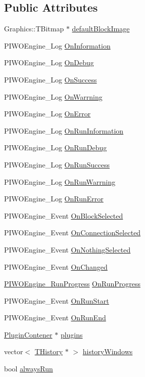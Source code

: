 \subsection*{Public Attributes}
\begin{CompactItemize}
\item 
Graphics::TBitmap $\ast$ \hyperlink{classPIWOEngine_23d5dbc92608ee42ba7975d2454ecbcf}{defaultBlockImage}
\item 
PIWOEngine\_\-Log \hyperlink{classPIWOEngine_e5b5e665729db134c485ff27305b7888}{OnInformation}
\item 
PIWOEngine\_\-Log \hyperlink{classPIWOEngine_52bbb80846422f21ab9b03d67ad67a60}{OnDebug}
\item 
PIWOEngine\_\-Log \hyperlink{classPIWOEngine_37a8c63dad516bc24be59cdca3a1eaa6}{OnSuccess}
\item 
PIWOEngine\_\-Log \hyperlink{classPIWOEngine_c7a83bdff3736e35b68584bcb3a4b699}{OnWarrning}
\item 
PIWOEngine\_\-Log \hyperlink{classPIWOEngine_55424b81f56591f23f3b58e0fdd399d2}{OnError}
\item 
PIWOEngine\_\-Log \hyperlink{classPIWOEngine_02e912fd9ead4eabd48b32f769bd77c1}{OnRunInformation}
\item 
PIWOEngine\_\-Log \hyperlink{classPIWOEngine_cc1ea09371765860dfc2912dc605f9be}{OnRunDebug}
\item 
PIWOEngine\_\-Log \hyperlink{classPIWOEngine_faa892e8c9a1a5973a300d2f02143897}{OnRunSuccess}
\item 
PIWOEngine\_\-Log \hyperlink{classPIWOEngine_ede20b6476b9e1d0db96878e2eee4481}{OnRunWarrning}
\item 
PIWOEngine\_\-Log \hyperlink{classPIWOEngine_303f960016f76986cba65e2c0aaea4e1}{OnRunError}
\item 
PIWOEngine\_\-Event \hyperlink{classPIWOEngine_ed5f12ba5e4872c5326126080a2cd821}{OnBlockSelected}
\item 
PIWOEngine\_\-Event \hyperlink{classPIWOEngine_45e9d4a676e2c489718b23491af65206}{OnConnectionSelected}
\item 
PIWOEngine\_\-Event \hyperlink{classPIWOEngine_df70bc69dc41278c1d2b02f308a1ba20}{OnNothingSelected}
\item 
PIWOEngine\_\-Event \hyperlink{classPIWOEngine_5322d9b9def723ae036b005c5a3c578e}{OnChanged}
\item 
\hyperlink{PIWOEngine_8h_8273eb67828fc9cc4e2b18b930dada38}{PIWOEngine\_\-RunProgress} \hyperlink{classPIWOEngine_c300fdccbd5cf4fa9ad200d10856fd3b}{OnRunProgress}
\item 
PIWOEngine\_\-Event \hyperlink{classPIWOEngine_b5d044c03265cf49fc87e58cd2134749}{OnRunStart}
\item 
PIWOEngine\_\-Event \hyperlink{classPIWOEngine_7de6e8504739db45b1ba5defeb63d80c}{OnRunEnd}
\item 
\hyperlink{classPluginContener}{PluginContener} $\ast$ \hyperlink{classPIWOEngine_6433fe1909e1f8fdecd7ebc9cc0ec4a3}{plugins}
\item 
vector$<$ \hyperlink{classTHistory}{THistory} $\ast$ $>$ \hyperlink{classPIWOEngine_dd08ebde966bf33e79750fb1b1dcca08}{historyWindows}
\item 
bool \hyperlink{classPIWOEngine_5730b8e65319ad792660fa205495f298}{alwaysRun}
\end{CompactItemize}
